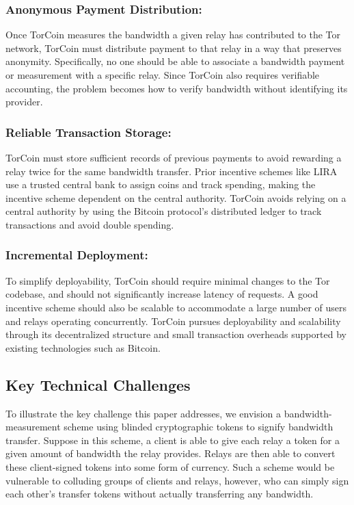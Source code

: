 \subsubsection{Anonymous Payment Distribution:} Once TorCoin measures
the bandwidth a given relay has contributed to the Tor network,
TorCoin must distribute payment to that relay in a way
that preserves anonymity. Specifically, no one should be able to
associate a bandwidth payment or measurement with a specific relay. Since
TorCoin also requires verifiable accounting, the problem becomes how to verify
bandwidth without identifying its provider.

\subsubsection{Reliable Transaction Storage:} TorCoin must
store sufficient records of previous payments to avoid rewarding a relay twice
for the same bandwidth transfer. Prior incentive schemes like
LIRA\cite{jansen2013lira} use a trusted central bank to assign coins and track
spending, making the incentive scheme dependent on the central
authority. TorCoin avoids relying on a central authority
by using the Bitcoin protocol's distributed ledger to
track transactions and avoid double spending\cite{karame2012two}.

\subsubsection{Incremental Deployment:} To simplify
deployability, TorCoin should require minimal changes to the Tor codebase, and
should not significantly increase latency of requests. A good incentive scheme
should also be scalable to accommodate a large number of users and relays
operating concurrently.
TorCoin pursues deployability and scalability through
its decentralized structure and small transaction overheads
supported by existing technologies such as Bitcoin.

\subsection{Key Technical Challenges}

To illustrate the key challenge this paper addresses,
we envision a \naive bandwidth-measurement scheme using blinded
cryptographic tokens to signify bandwidth transfer. Suppose in this scheme, a
client is able to give each relay a token for a given amount of bandwidth
the relay provides.
Relays are then able to convert these client-signed tokens into some
form of currency.  Such a scheme would be vulnerable to colluding groups of
clients and relays, however, who can simply sign each other's transfer tokens
without actually transferring any bandwidth.

